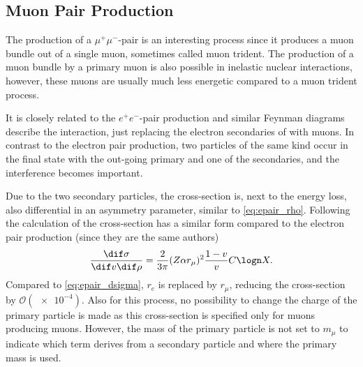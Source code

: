 \subsection{Muon Pair Production} \label{sec:mupair}

The production of a $\mu^+ \mu^-$-pair is an interesting process since it produces a muon bundle out of a single muon, sometimes called muon trident.
The production of a muon bundle by a primary muon is also possible in inelastic nuclear interactions, however, these muons are usually much less energetic compared to a muon trident process.

It is closely related to the $e^+e^-$-pair production and similar Feynman diagrams describe the interaction, just replacing the electron secondaries of  with muons.
In contrast to the electron pair production, two particles of the same kind occur in the final state with the out-going primary and one of the secondaries, and the interference becomes important.

Due to the two secondary particles, the cross-section is, next to the energy loss, also differential in an asymmetry parameter, similar to \eqref{eq:epair_rho}.
Following the calculation of \cite{Kelner00mupair} the cross-section has a similar form compared to the electron pair production (since they are the same authors)
\begin{align}
    \frac{\dif \sigma}{\dif v \dif \rho} =
    \frac{2}{3\pi} (Z \alpha r_\mu)^2 \frac{1 - v}{v} C \logn X .
\end{align}
Compared to \eqref{eq:epair_dsigma}, $r_e$ is replaced by $r_\mu$, reducing the cross-section by $\mathcal{O}(\num{e-4})$.
Also for this process, no possibility to change the charge of the primary particle is made as this cross-section is specified only for muons producing muons.
However, the mass of the primary particle is not set to $m_\mu$ to indicate which term derives from a secondary particle and where the primary mass is used.

